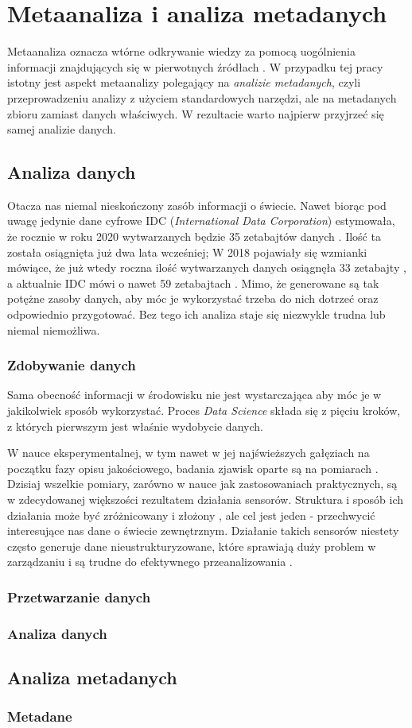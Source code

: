 \chapter{Metaanaliza i analiza metadanych}

Metaanaliza oznacza wtórne odkrywanie wiedzy za pomocą uogólnienia informacji znajdujących się w pierwotnych źródłach \cite{higgins2019cochrane}.
W przypadku tej pracy istotny jest aspekt metaanalizy polegający na \textit{analizie metadanych}, czyli przeprowadzeniu analizy z użyciem standardowych narzędzi, ale na metadanych zbioru zamiast danych właściwych.
W rezultacie warto najpierw przyjrzeć się samej analizie danych.

\section{Analiza danych}

Otacza nas niemal nieskończony zasób informacji o świecie.
Nawet biorąc pod uwagę jedynie dane cyfrowe IDC (\textit{International Data Corporation}) estymowała, że rocznie w roku 2020 wytwarzanych będzie 35 zetabajtów danych \cite{tien2013big}.
Ilość ta została osiągnięta już dwa lata wcześniej; W 2018 pojawiały się wzmianki mówiące, że już wtedy roczna ilość wytwarzanych danych osiągnęła 33 zetabajty \cite{Patrizio:2018}, a aktualnie IDC mówi o nawet 59 zetabajtach \cite{IDC:2020}.
Mimo, że generowane są tak potężne zasoby danych, aby móc je wykorzystać trzeba do nich dotrzeć oraz odpowiednio przygotować.
Bez tego ich analiza staje się niezwykle trudna lub niemal niemożliwa.

	\subsection{Zdobywanie danych}
	Sama obecność informacji w środowisku nie jest wystarczająca aby móc je w jakikolwiek sposób wykorzystać.
	Proces \textit{Data Science} składa się z pięciu kroków, z których pierwszym jest właśnie wydobycie danych.

	W nauce eksperymentalnej, w tym nawet w jej najświeższych gałęziach na początku fazy opisu jakościowego, badania zjawisk oparte są na pomiarach \cite{brandt1998data}.
	Dzisiaj wszelkie pomiary, zarówno w nauce jak zastosowaniach praktycznych, są w zdecydowanej większości rezultatem działania sensorów.
	Struktura i sposób ich działania może być zróżnicowany i złożony \cite{deshpande2004model,boyer2009scada}, ale cel jest jeden - przechwycić interesujące nas dane o świecie zewnętrznym.
	Działanie takich sensorów niestety często generuje dane nieustrukturyzowane, które sprawiają duży problem w zarządzaniu i są trudne do efektywnego przeanalizowania \cite{blumberg2003problem}.

	\subsection{Przetwarzanie danych}
	\subsection{Analiza danych}

\section{Analiza metadanych}
	\subsection{Metadane}
